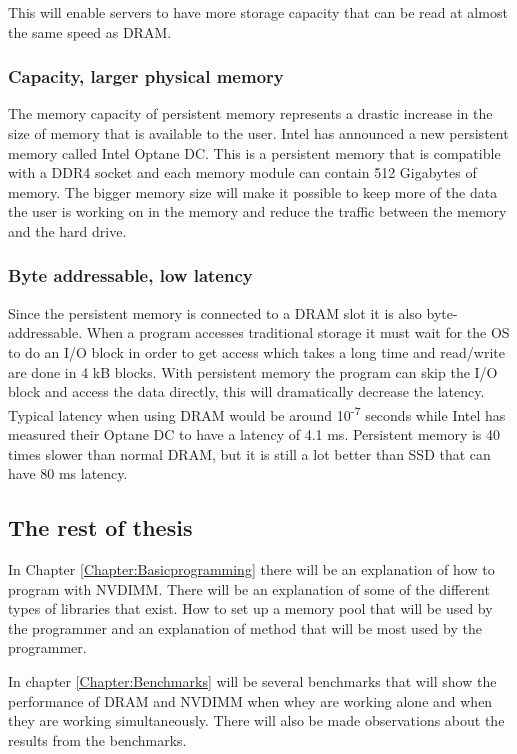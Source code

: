 \documentclass[12pt,a4paper,USenglish]{article}      %
\begin{document}
This will enable servers to have more storage capacity that can be read at almost the same speed as DRAM.

\subsubsection{Capacity, larger physical memory}
The memory capacity of persistent memory represents a drastic increase in the size of memory that is available to the user. Intel has announced a new persistent memory called Intel Optane DC\cite{side1}. This is a persistent memory that is compatible with a DDR4 socket and each memory module can contain 512 Gigabytes of memory. The bigger memory size will make it possible to keep more of the data the user is working on in the memory and reduce the traffic between the memory and the hard drive.

\subsubsection{Byte addressable, low latency}
Since the persistent memory is connected to a DRAM slot it is also byte-addressable. When a program accesses traditional storage it must wait for the OS to do an I/O block in order to get access which takes a long time and read/write are done in 4 kB blocks. With persistent memory the program can skip the I/O block and access the data directly, this will dramatically decrease the latency. Typical latency when using DRAM would be around 10\textsuperscript{-7} seconds\cite{lerebok} while Intel has measured their Optane DC to have a latency of 4.1 ms\cite{optane2}. Persistent memory is 40 times slower than normal DRAM, but it is still a lot better than SSD that can have 80 ms latency.

\subsection{The rest of thesis}
In Chapter \ref{Chapter:Basicprogramming} there will be an explanation of how to program with NVDIMM. There will be an explanation of some of the different types of libraries that exist. How to set up a memory pool that will be used by the programmer and an explanation of method that will be most used by the programmer. 

In chapter \ref{Chapter:Benchmarks} will be several benchmarks that will show the performance of DRAM and NVDIMM when whey are working alone and when they are working simultaneously. There will also be made observations about the results from the benchmarks.
\end{document}

